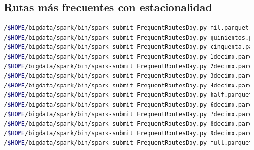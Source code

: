\subsection{Rutas más frecuentes con estacionalidad}
\begin{lstlisting}[label=sfreqday,language=sh,frame=single,caption=Script rutas más frecuentes con estacionalidad en modo pseudo-distribuido]
/$HOME/bigdata/spark/bin/spark-submit FrequentRoutesDay.py mil.parquet martes 01-01 11:00
/$HOME/bigdata/spark/bin/spark-submit FrequentRoutesDay.py quinientos.parquet martes 01-01 11:00
/$HOME/bigdata/spark/bin/spark-submit FrequentRoutesDay.py cinquenta.parquet martes 01-01 11:00
/$HOME/bigdata/spark/bin/spark-submit FrequentRoutesDay.py 1decimo.parquet martes 01-01 11:00
/$HOME/bigdata/spark/bin/spark-submit FrequentRoutesDay.py 2decimo.parquet martes 01-01 11:00
/$HOME/bigdata/spark/bin/spark-submit FrequentRoutesDay.py 3decimo.parquet martes 01-01 11:00
/$HOME/bigdata/spark/bin/spark-submit FrequentRoutesDay.py 4decimo.parquet martes 01-01 11:00
/$HOME/bigdata/spark/bin/spark-submit FrequentRoutesDay.py half.parquet martes 01-01 11:00
/$HOME/bigdata/spark/bin/spark-submit FrequentRoutesDay.py 6decimo.parquet martes 01-01 11:00
/$HOME/bigdata/spark/bin/spark-submit FrequentRoutesDay.py 7decimo.parquet martes 01-01 11:00
/$HOME/bigdata/spark/bin/spark-submit FrequentRoutesDay.py 8decimo.parquet martes 01-01 11:00
/$HOME/bigdata/spark/bin/spark-submit FrequentRoutesDay.py 9decimo.parquet martes 01-01 11:00
/$HOME/bigdata/spark/bin/spark-submit FrequentRoutesDay.py full.parquet martes 01-01 11:00
\end{lstlisting}
